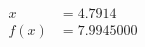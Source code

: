 \documentclass[preview]{standalone}
\begin{document}
\begin{align*}
x &= 4.7914\\f(x) &= 7.9945000
\end{align*}
\end{document}
